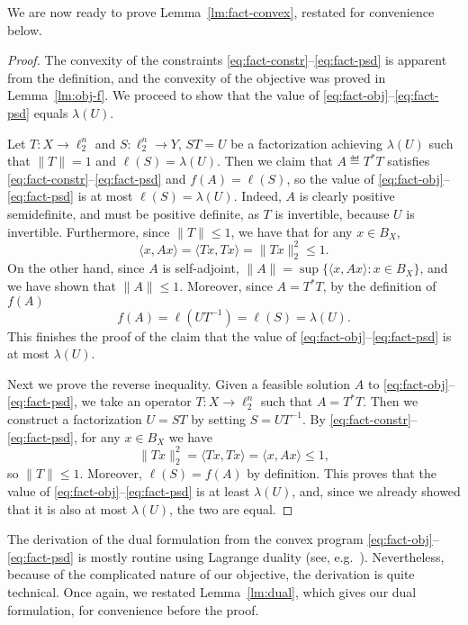 We are now ready to prove Lemma~\ref{lm:fact-convex}, restated for
convenience below.
\factconvex*
\begin{proof}%
  The convexity of the constraints
  \eqref{eq:fact-constr}--\eqref{eq:fact-psd} is apparent from the
  definition, and the convexity of the objective was proved in
  Lemma~\ref{lm:obj-f}. We proceed to show that the value of
  \eqref{eq:fact-obj}--\eqref{eq:fact-psd} equals $\lambda(U)$.

  Let $T:X \to \ell_2^n$ and $S:\ell_2^n \to Y$, $ST = U$ be a
  factorization achieving $\lambda(U)$ such that $\|T\| = 1$ and
  $\ell(S) = \lambda(U)$. Then we claim that $A \eqdef T^*T$ satisfies
  \eqref{eq:fact-constr}--\eqref{eq:fact-psd} and $f(A) = \ell(S) $,
  so the value of \eqref{eq:fact-obj}--\eqref{eq:fact-psd} is at most
  $\ell(S) = \lambda(U)$. Indeed, $A$ is clearly positive
  semidefinite, and must be positive definite, as $T$ is invertible,
  because $U$ is invertible. Furthermore, since $\|T\|\le 1$, we have
  that for any $x \in B_X$,
  \[\langle x, Ax \rangle = \langle Tx, Tx\rangle =
  \|Tx\|^2_2 \le 1.\] On the other hand, since $A$ is self-adjoint,
  $\|A\| = \sup\{\langle x, Ax\rangle: x \in B_X\}$, and we have shown
  that $\|A\| \le 1$. Moreover, since $A = T^* T$, by the definition
  of $f(A)$
  \[
  f(A) = \ell(UT^{-1}) = \ell(S) = \lambda(U).
  \]
  This finishes the proof of the claim that the value of
  \eqref{eq:fact-obj}--\eqref{eq:fact-psd} is at most $\lambda(U)$.
  
  Next we prove the reverse inequality. Given a feasible solution $A$
  to \eqref{eq:fact-obj}--\eqref{eq:fact-psd}, we take an operator
  $T:X \to \ell_2^n$ such that $A = T^* T$. Then we construct a
  factorization $U=ST$ by setting $S = UT^{-1}$.  By
  \eqref{eq:fact-constr}--\eqref{eq:fact-psd}, for any $x \in B_X$ we
  have
  \[
  \|Tx\|^2_2 = \langle Tx, Tx\rangle = \langle x, Ax \rangle  \le
  1,\] so $\|T\| \le 1$. Moreover, $\ell(S) = f(A)$ by
  definition. This proves that the value of
  \eqref{eq:fact-obj}--\eqref{eq:fact-psd} is at least
  $\lambda(U)$, and, since we already showed that it is also at
  most $\lambda(U)$, the two are equal.
\end{proof}

The derivation of the dual formulation from the
convex program \eqref{eq:fact-obj}--\eqref{eq:fact-psd} is mostly
routine using Lagrange duality (see,
e.g.~\cite{BoydV04}). Nevertheless, because of the complicated nature
of our objective, the derivation is quite technical. Once again, we
restated Lemma~\ref{lm:dual}, which gives our dual formulation, for
convenience before the proof. 


